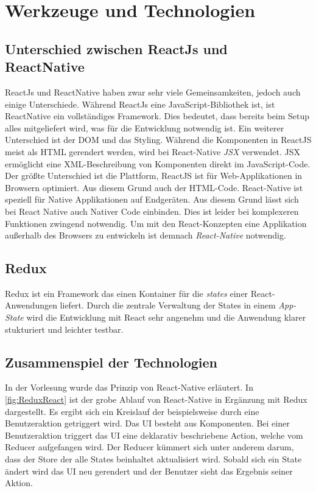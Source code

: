 \section{Werkzeuge und Technologien}
\subsection{Unterschied zwischen ReactJs und ReactNative}
ReactJs und ReactNative haben zwar sehr viele Gemeinsamkeiten, jedoch auch einige Unterschiede.
Während ReactJs eine JavaScript-Bibliothek ist, ist ReactNative ein vollständiges Framework. Dies bedeutet, dass bereits beim Setup alles mitgeliefert wird, was für die
Entwicklung notwendig ist. Ein weiterer Unterschied ist der DOM und das Styling. Während die Komponenten in ReactJS meist als HTML gerendert werden, wird bei React-Native
\textit{JSX} verwendet. JSX ermöglicht eine XML-Beschreibung von Komponenten direkt im JavaScript-Code.\\
Der größte Unterschied ist die Plattform, ReactJS ist für Web-Applikationen in Browsern optimiert. Aus diesem Grund auch der HTML-Code. React-Native ist speziell für Native Applikationen auf
Endgeräten. Aus diesem Grund lässt sich bei React Native auch Nativer Code einbinden. Dies ist leider bei komplexeren Funktionen zwingend notwendig. Um mit den React-Konzepten eine Applikation außerhalb des
Browsers zu entwickeln ist demnach \textit{React-Native} notwendig. \cite{ReactJSvsReactNative:online}

\subsection{Redux}
Redux ist ein Framework das einen Kontainer für die \textit{states} einer React-Anwendungen liefert. Durch die zentrale Verwaltung der States in einem \textit{App-State}
wird die Entwicklung mit React sehr angenehm und die Anwendung klarer stukturiert und leichter testbar.

\subsection{Zusammenspiel der Technologien}
In der Vorlesung wurde das Prinzip von React-Native erläutert. In \autoref{fig:ReduxReact} ist
der grobe Ablauf von React-Native in Ergänzung mit Redux dargestellt. Es ergibt sich ein Kreislauf der beispielsweise durch
eine Benutzeraktion getriggert wird. Das UI besteht aus Komponenten. Bei einer Benutzeraktion
triggert das UI eine deklarativ beschriebene Action, welche vom Reducer aufgefangen wird.
Der Reducer kümmert sich unter anderem darum, dass der Store der alle States beinhaltet aktualisiert wird.
Sobald sich ein State ändert wird das UI neu gerendert und der Benutzer sieht das Ergebnis seiner Aktion.

